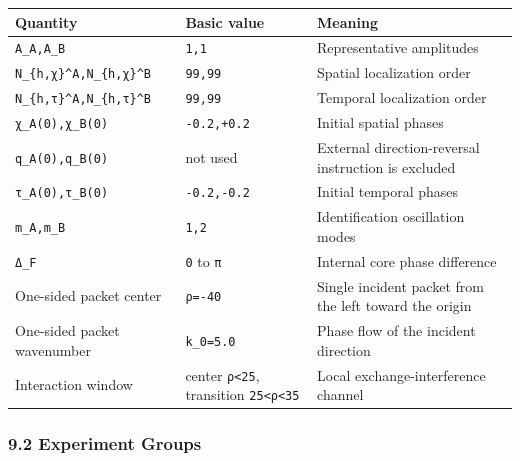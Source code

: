 \documentclass[
  a4paper,
]{article}
\newcounter{none} %
\begin{document}
{\def\LTcaptype{none} %
\begin{longtable}[]{@{}
  >{\raggedright\arraybackslash}p{}
  >{\raggedleft\arraybackslash}p{}
  >{\raggedright\arraybackslash}p{}@{}}
\toprule\noalign{}
\begin{minipage}[b]{\linewidth}\raggedright
Quantity
\end{minipage} & \begin{minipage}[b]{\linewidth}\raggedleft
Basic value
\end{minipage} & \begin{minipage}[b]{\linewidth}\raggedright
Meaning
\end{minipage} \\
\midrule\noalign{}
\endhead
\bottomrule\noalign{}
\endlastfoot
\texttt{A\_A,A\_B} & \texttt{1,1} & Representative amplitudes \\
\texttt{N\_\{h,χ\}\^{}A,N\_\{h,χ\}\^{}B} & \texttt{99,99} & Spatial
localization order \\
\texttt{N\_\{h,τ\}\^{}A,N\_\{h,τ\}\^{}B} & \texttt{99,99} & Temporal
localization order \\
\texttt{χ\_A(0),χ\_B(0)} & \texttt{-0.2,+0.2} & Initial spatial
phases \\
\texttt{q\_A(0),q\_B(0)} & not used & External direction-reversal
instruction is excluded \\
\texttt{τ\_A(0),τ\_B(0)} & \texttt{-0.2,-0.2} & Initial temporal
phases \\
\texttt{m\_A,m\_B} & \texttt{1,2} & Identification oscillation modes \\
\texttt{Δ\_F} & \texttt{0} to \texttt{π} & Internal core phase
difference \\
One-sided packet center & \texttt{ρ=-40} & Single incident packet from
the left toward the origin \\
One-sided packet wavenumber & \texttt{k\_0=5.0} & Phase flow of the
incident direction \\
Interaction window & center \texttt{\textbar{}ρ\textbar{}\textless{}25},
transition \texttt{25\textless{}\textbar{}ρ\textbar{}\textless{}35} &
Local exchange-interference channel \\
\end{longtable}
}

\subsubsection{9.2 Experiment Groups}\label{experiment-groups}
\end{document}
